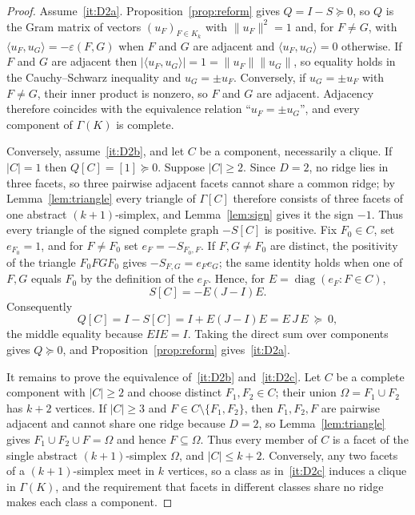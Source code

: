 \documentclass[11pt,reqno]{amsart}
\numberwithin{equation}{section}
\theoremstyle{plain}
\theoremstyle{definition}
\newcommand{\eps}{\varepsilon}
\begin{document}
\begin{proof}
Assume~\ref{it:D2a}. Proposition~\ref{prop:reform} gives
$Q=I-S\succeq0$, so $Q$ is the Gram matrix of vectors ${(u_F)}_{F\in K_k}$ with $\|u_F\|^2=1$ and,
for $F\ne G$, with $\langle u_F,u_G\rangle=-\eps(F,G)$ when $F$ and $G$ are adjacent and
$\langle u_F,u_G\rangle=0$ otherwise. If $F$ and $G$ are adjacent then
$|\langle u_F,u_G\rangle|=1=\|u_F\|\|u_G\|$, so equality holds in the Cauchy--Schwarz inequality
and $u_G=\pm u_F$. Conversely, if $u_G=\pm u_F$ with $F\ne G$, their inner product is nonzero, so
$F$ and $G$ are adjacent. Adjacency therefore coincides with the equivalence relation
``$u_F=\pm u_G$'', and every component of $\Gamma(K)$ is complete.

Conversely, assume~\ref{it:D2b}, and let $C$ be a component, necessarily a clique. If $|C|=1$
then $Q[C]=[1]\succeq0$. Suppose $|C|\ge2$. Since $D=2$, no ridge lies in three facets, so three
pairwise adjacent facets cannot share a common ridge; by Lemma~\ref{lem:triangle} every triangle
of $\Gamma[C]$ therefore consists of three facets of one abstract $(k+1)$-simplex, and
Lemma~\ref{lem:sign} gives it the sign $-1$. Thus every triangle of the signed complete graph
$-S[C]$ is positive. Fix $F_0\in C$, set $e_{F_0}=1$, and for $F\ne F_0$ set
$e_F=-S_{F_0,F}$. If $F,G\ne F_0$ are distinct, the positivity of the triangle
$F_0FGF_0$ gives $-S_{F,G}=e_Fe_G$; the same identity holds when one of $F,G$ equals $F_0$
by the definition of the $e_F$. Hence, for $E=\operatorname{diag}(e_F:F\in C)$,
\[
  S[C]=-E(J-I)E .
\]
Consequently
\[
  Q[C]=I-S[C]=I+E(J-I)E=E\,J\,E\ \succeq\ 0 ,
\]
the middle equality because $EIE=I$. Taking the direct sum over components gives $Q\succeq0$,
and Proposition~\ref{prop:reform} gives~\ref{it:D2a}.

It remains to prove the equivalence of~\ref{it:D2b} and~\ref{it:D2c}. Let $C$ be a complete
component with $|C|\ge2$ and
choose distinct $F_1,F_2\in C$; their union $\Omega=F_1\cup F_2$ has $k+2$ vertices. If
$|C|\ge3$ and $F\in C\setminus\{F_1,F_2\}$, then $F_1,F_2,F$ are pairwise adjacent and cannot
share one ridge because $D=2$, so Lemma~\ref{lem:triangle} gives $F_1\cup F_2\cup F=\Omega$ and
hence $F\subseteq\Omega$. Thus every member of $C$ is a facet of the single abstract
$(k+1)$-simplex $\Omega$, and $|C|\le k+2$. Conversely, any two facets of a $(k+1)$-simplex meet
in $k$ vertices, so a class as in~\ref{it:D2c} induces a clique in $\Gamma(K)$, and the
requirement that facets in different classes share no ridge makes each class a component.
\end{proof}
\end{document}

